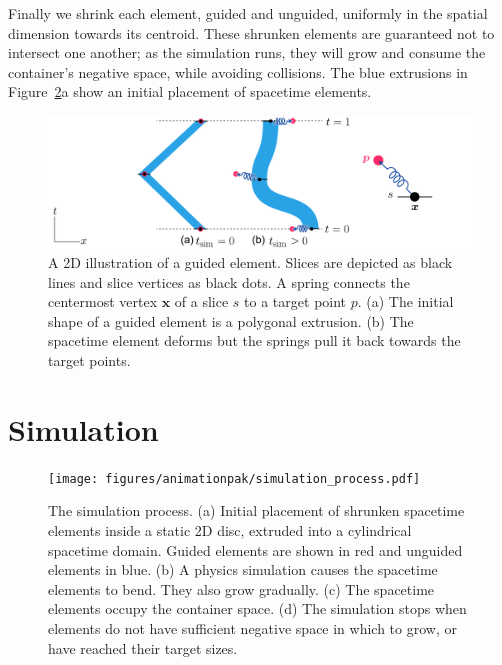 Finally we shrink each element, guided and unguided, uniformly in the spatial dimension
towards its centroid.  These shrunken elements are
guaranteed not to intersect one another; as the simulation runs, they
will grow and consume the container's negative space, while avoiding
collisions.
The blue extrusions in Figure~\ref{fig_animationpak_simulation_process}a show an
initial placement of spacetime elements.

\begin{figure}
\centering
\includegraphics[width=1.0\textwidth]{figures/animationpak/guided_element.pdf} 
\caption[A 2D illustration of a guided element]{
\label{fig_animationpak_guided_element} A 2D illustration of a guided element.
Slices are depicted as black lines and slice vertices as black dots.
A spring connects the centermost vertex $\bm{x}$ of a slice $s$ to a target
point $p$.
(a) The initial shape of a guided element is a polygonal extrusion.
(b) The spacetime element deforms but the springs pull it back towards
the target points.}
\end{figure}




\section{Simulation}
\label{animationpak_simulation}


\begin{figure}[h]
\vspace{-20pt}
\centering
\texttt{[image: figures/animationpak/simulation\_process.pdf]} 
\caption[An illustration of the AnimationPak simulation process]{
\label{fig_animationpak_simulation_process} The simulation process. 
(a) Initial placement of 
shrunken spacetime elements inside a static 2D disc, extruded into a 
cylindrical spacetime domain.
Guided elements are shown in red and unguided elements in blue.
(b) A physics simulation causes the spacetime elements to bend. They
also grow gradually.
(c) The spacetime elements occupy the container space.
(d) The simulation stops when elements do not have sufficient negative
space in which to grow, or have reached their target sizes.
}
\end{figure}

